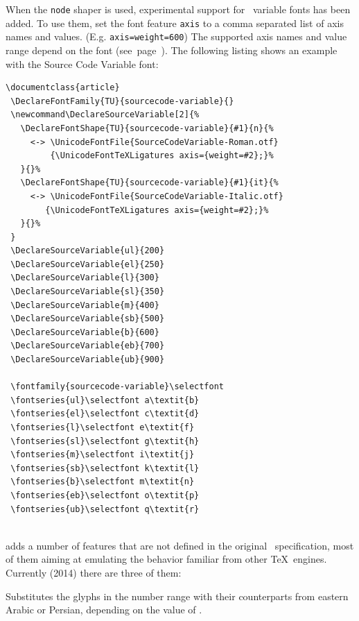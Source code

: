   \endaltitem

   When\label{variablefonts}
   the \texttt{node} shaper is used,
   experimental support for \OpenType\ variable
   fonts has been added. To use them, set the font feature \texttt{axis} to
   a comma separated list of axis names and values. (E.g.  \texttt{axis={weight=600}})
   The supported axis names and value range depend on the font (see~page~\pageref{variablefonts}).
   The following listing shows an example with the Source Code Variable font:

  \begin{lstlisting}[columns=fullflexible]
\documentclass{article}
 \DeclareFontFamily{TU}{sourcecode-variable}{}
 \newcommand\DeclareSourceVariable[2]{%
   \DeclareFontShape{TU}{sourcecode-variable}{#1}{n}{%
     <-> \UnicodeFontFile{SourceCodeVariable-Roman.otf}
         {\UnicodeFontTeXLigatures axis={weight=#2};}%
   }{}%
   \DeclareFontShape{TU}{sourcecode-variable}{#1}{it}{%
     <-> \UnicodeFontFile{SourceCodeVariable-Italic.otf}
        {\UnicodeFontTeXLigatures axis={weight=#2};}%
   }{}%
 }
 \DeclareSourceVariable{ul}{200}
 \DeclareSourceVariable{el}{250}
 \DeclareSourceVariable{l}{300}
 \DeclareSourceVariable{sl}{350}
 \DeclareSourceVariable{m}{400}
 \DeclareSourceVariable{sb}{500}
 \DeclareSourceVariable{b}{600}
 \DeclareSourceVariable{eb}{700}
 \DeclareSourceVariable{ub}{900}
 
 \fontfamily{sourcecode-variable}\selectfont
 \fontseries{ul}\selectfont a\textit{b}
 \fontseries{el}\selectfont c\textit{d}
 \fontseries{l}\selectfont e\textit{f}
 \fontseries{sl}\selectfont g\textit{h}
 \fontseries{m}\selectfont i\textit{j}
 \fontseries{sb}\selectfont k\textit{l}
 \fontseries{b}\selectfont m\textit{n}
 \fontseries{eb}\selectfont o\textit{p}
 \fontseries{ub}\selectfont q\textit{r}
 
\end{lstlisting}

  \enddescriptions

\endsubsection

 adds a number of features that are not defined
in the original \OpenType\ specification, most of them
aiming at emulating the behavior familiar from other \TeX\ engines.
%
Currently (2014) there are three of them:

\begindescriptions

          Substitutes the glyphs in the  number range
          with their counterparts from eastern Arabic or Persian,
          depending on the value of .
  \endaltitem

